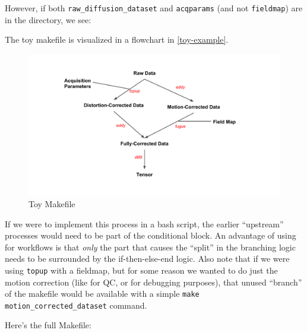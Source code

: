 However, if both \texttt{raw_diffusion_dataset} and \texttt{acqparams} (and not \texttt{fieldmap}) are in the directory, we see:

The toy makefile is visualized in a flowchart in \autoref{toy-example}.

\begin{figure}
	\begin{center}  %
		\includegraphics[width=\textwidth]{images/distcorr-flowchart.pdf}
	\end{center}
	\label{toy-example}
	\caption{Toy Makefile}
\end{figure}


If we were to implement this process in a bash script, the earlier ``upstream'' processes would need to be part of the conditional block. An advantage of using \maken{} for workflows is that \textit{only} the part that causes the ``split'' in the branching logic needs to be surrounded by the if-then-else-end logic. Also note that if we were using \texttt{topup} with a fieldmap, but for some reason we wanted to do just the motion correction (like for QC, or for debugging purposes), that unused ``branch'' of the makefile would be available with a simple \texttt{make motion_corrected_dataset} command. 

Here's the full Makefile:

